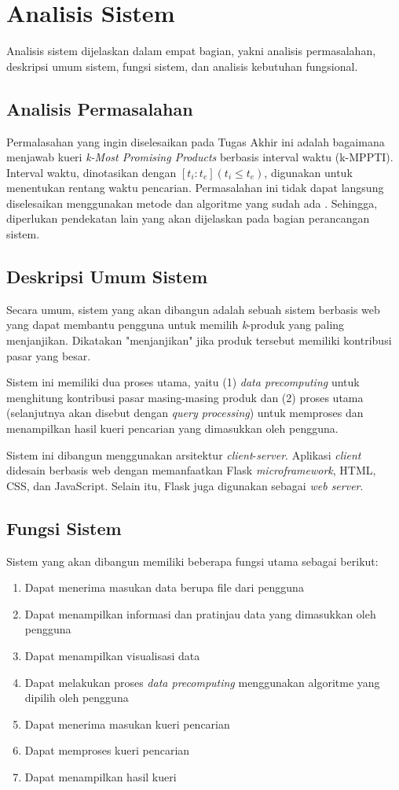 \section{Analisis Sistem}
\tab Analisis sistem dijelaskan dalam empat bagian, yakni analisis permasalahan, deskripsi umum sistem, fungsi sistem, dan analisis kebutuhan fungsional.

\subsection{Analisis Permasalahan}
\tab Permalasahan yang ingin diselesaikan pada Tugas Akhir ini adalah bagaimana menjawab kueri \textit{k-Most Promising Products} berbasis interval waktu (k-MPPTI). Interval waktu, dinotasikan dengan $[t_i:t_e ](t_i \leq t_e)$, digunakan untuk menentukan rentang waktu pencarian. Permasalahan ini tidak dapat langsung diselesaikan menggunakan metode dan algoritme yang sudah ada \cite{kmpp}. Sehingga, diperlukan pendekatan lain yang akan dijelaskan pada bagian perancangan sistem.

\subsection{Deskripsi Umum Sistem}
\tab Secara umum, sistem yang akan dibangun adalah sebuah sistem berbasis web yang dapat membantu pengguna untuk memilih \textit{k}-produk yang paling menjanjikan. Dikatakan "menjanjikan" jika produk tersebut memiliki kontribusi pasar yang besar.

Sistem ini memiliki dua proses utama, yaitu (1) \textit{data precomputing} untuk menghitung kontribusi pasar masing-masing produk dan (2) proses utama (selanjutnya akan disebut dengan \textit{query processing}) untuk memproses dan menampilkan hasil kueri pencarian yang dimasukkan oleh pengguna.

Sistem ini dibangun menggunakan arsitektur \textit{client}-\textit{server}. Aplikasi \textit{client} didesain berbasis web dengan memanfaatkan Flask \textit{microframework}, HTML, CSS, dan JavaScript. Selain itu, Flask juga digunakan sebagai \textit{web server}. 

\subsection{Fungsi Sistem}
\tab Sistem yang akan dibangun memiliki beberapa fungsi utama sebagai berikut:
\begin{enumerate}
	\item Dapat menerima masukan data berupa file dari pengguna
	\item Dapat menampilkan informasi dan pratinjau data yang dimasukkan oleh pengguna
	\item Dapat menampilkan visualisasi data
	\item Dapat melakukan proses \textit{data precomputing} menggunakan algoritme yang dipilih oleh pengguna
	\item Dapat menerima masukan kueri pencarian 
	\item Dapat memproses kueri pencarian
	\item Dapat menampilkan hasil kueri
\end{enumerate}

